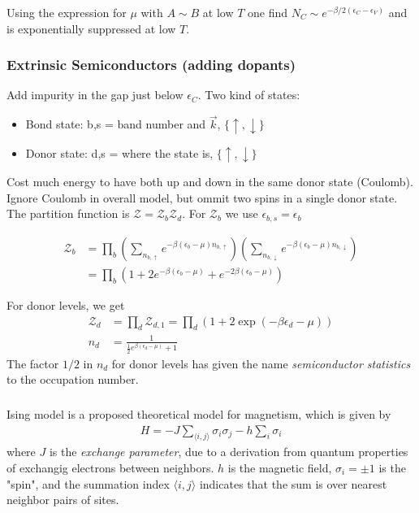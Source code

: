 \documentclass[a4paper, english, 12pt]{article}
\newcommand{\eps}{\epsilon}
\newcommand{\closed}[1]{\left( #1 \right)}
\newcommand{\curly}[1]{\{ #1 \} }
\newcommand{\Z}{\mathcal{Z}}
\begin{document}
\begin{multicols*}{2}
Using the expression for $\mu$ with $A\sim B$ at low $T$ one find $N_C \sim e^{-\beta/2 (\eps_C-\eps_V)}$ and is exponentially suppressed at low $T$. 


\subsubsection*{\tiny Extrinsic Semiconductors (adding dopants)}
Add impurity in the gap just below $\eps_C$. Two kind of states:
\begin{itemize}
    \item Bond state: b,s = band number and $\vec{k}$, $\curly{\uparrow,\downarrow}$  
    \item Donor state: d,s = where the state is, $\curly{\uparrow,\downarrow}$
\end{itemize}
Cost much energy to have both up and down in the same donor state (Coulomb). Ignore Coulomb in overall model, but ommit two spins in a single donor state. The partition function is $\Z=\Z_b \Z_d$. For $\Z_b$ we use $\eps_{b,s}=\eps_b$

\begin{align*}
    \Z_b &= \prod_b \closed{\sum_{n_{b,\uparrow}} e^{-\beta(\eps_b-\mu)n_{b,\uparrow}} } \closed{\sum_{n_{b,\downarrow}} e^{-\beta(\eps_b-\mu)n_{b,\downarrow}} } \\ 
    &= \prod_b \closed{1 + 2 e^{-\beta(\eps_b-\mu)} + e^{-2\beta(\eps_b-\mu)}}
\end{align*}

For donor levels, we get 
\begin{align*}
    \Z_d &= \prod_d \Z_{d,1} =  \prod_d (1+2\exp(-\beta\eps_d - \mu)) \\ 
    n_d &= \frac{1}{\frac{1}{2}e^{\beta(\eps_d-\mu)}+1}
\end{align*} 
The factor $1/2$ in $n_d$ for donor levels has given the name \textit{semiconductor statistics} to the occupation number. 



\subsubsection*{}
Ising model is a proposed theoretical model for magnetism, which is given by 
\begin{align*}
    H = -J \sum_{\langle{i,j}\rangle} \sigma_i \sigma_j - h \sum_i \sigma_i 
\end{align*}
where $J$ is the \textit{exchange parameter}, due to a derivation from quantum properties of exchangig electrons between neighbors. $h$ is the magnetic field, $\sigma_i=\pm1$ is the "spin", and the summation index $\langle i,j \rangle$ indicates that the sum is over nearest neighbor pairs of sites. 


\end{multicols*}
\end{document}
